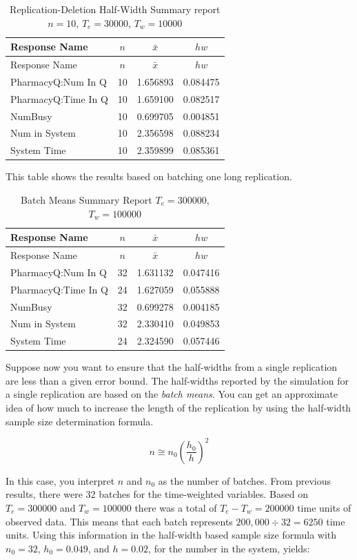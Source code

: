 \documentclass[
]{book}
\theoremstyle{definition}
\theoremstyle{definition}
\theoremstyle{definition}
\theoremstyle{definition}
\theoremstyle{remark}
\begin{document}
\begin{longtable}[]{@{}lccc@{}}
\caption{Replication-Deletion Half-Width Summary report \(n=10\), \(T_e = 30000\), \(T_w = 10000\)}\tabularnewline
\toprule
Response Name & \(n\) & \(\bar{x}\) & \(hw\) \\
\midrule
\endfirsthead
\toprule
Response Name & \(n\) & \(\bar{x}\) & \(hw\) \\
\midrule
\endhead
PharmacyQ:Num In Q & 10 & 1.656893 & 0.084475 \\
PharmacyQ:Time In Q & 10 & 1.659100 & 0.082517 \\
NumBusy & 10 & 0.699705 & 0.004851 \\
Num in System & 10 & 2.356598 & 0.088234 \\
System Time & 10 & 2.359899 & 0.085361 \\
\bottomrule
\end{longtable}

This table shows the results based on batching one long replication.

\begin{longtable}[]{@{}lccc@{}}
\caption{Batch Means Summary Report \(T_e = 300000\), \(T_w = 100000\)}\tabularnewline
\toprule
Response Name & \(n\) & \(\bar{x}\) & \(hw\) \\
\midrule
\endfirsthead
\toprule
Response Name & \(n\) & \(\bar{x}\) & \(hw\) \\
\midrule
\endhead
PharmacyQ:Num In Q & 32 & 1.631132 & 0.047416 \\
PharmacyQ:Time In Q & 24 & 1.627059 & 0.055888 \\
NumBusy & 32 & 0.699278 & 0.004185 \\
Num in System & 32 & 2.330410 & 0.049853 \\
System Time & 24 & 2.324590 & 0.057446 \\
\bottomrule
\end{longtable}

Suppose now you want to ensure that the half-widths from a single
replication are less than a given error bound. The half-widths reported
by the simulation for a single replication are based on the \emph{batch
means}. You can get an approximate idea of how much to increase the
length of the replication by using the half-width sample size
determination formula.

\[n \cong n_0 \left(\dfrac{h_0}{h}\right)^2\]

In this case, you interpret \(n\) and \(n_0\) as the number of batches. From
previous results, there were 32 batches for the time-weighted
variables. Based on \(T_e = 300000\) and \(T_w = 100000\) there was a total
of \(T_e - T_w = 200000\) time units of observed data. This means that
each batch represents \(200,000\div 32 = 6250\) time units. Using this
information in the half-width based sample size formula with \(n_0 = 32\),
\(h_0 = 0.049\), and \(h = 0.02\), for the number in the system, yields:
\end{document}
